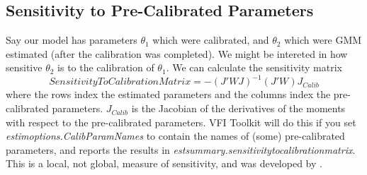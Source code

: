 \subsection{Sensitivity to Pre-Calibrated Parameters}
Say our model has parameters $\theta_1$ which were calibrated, and $\theta_2$ which were GMM estimated (after the calibration was completed). We might be intereted in how sensitive $\theta_2$ is to the calibration of $\theta_1$. We can calculate the sensitivity matrix
$$SensitivityToCalibrationMatrix=-(J'WJ)^{-1} (J'W) J_{Calib}$$
where the rows index the estimated parameters and the columns index the pre-calibrated parameters. $J_{Calib}$ is the Jacobian of the derivatives of the moments with respect to the pre-calibrated parameters. VFI Toolkit will do this if you set \textit{estimoptions.CalibParamNames} to contain the names of (some) pre-calibrated parameters, and reports the results in \textit{estsummary.sensitivitytocalibrationmatrix}. This is a local, not global, measure of sensitivity, and was developed by \cite*{Jorgensen2023}.












